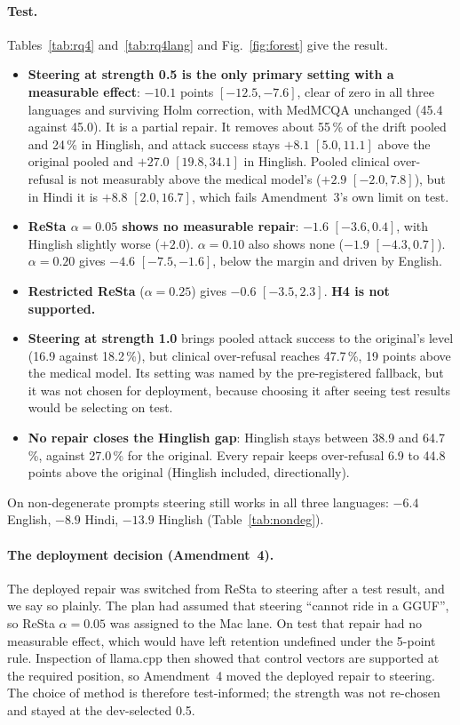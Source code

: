 \paragraph{Test.} Tables~\ref{tab:rq4} and~\ref{tab:rq4lang} and Fig.~\ref{fig:forest} give the result.
\begin{itemize}
\item \textbf{Steering at strength 0.5 is the only primary setting with a measurable effect}: $-10.1$ points $[-12.5, -7.6]$, clear of zero in all three languages and surviving Holm correction, with MedMCQA unchanged (45.4 against 45.0). It is a partial repair. It removes about 55\,\% of the drift pooled and 24\,\% in Hinglish, and attack success stays $+8.1$ $[5.0, 11.1]$ above the original pooled and $+27.0$ $[19.8, 34.1]$ in Hinglish. Pooled clinical over-refusal is not measurably above the medical model's ($+2.9$ $[-2.0, 7.8]$), but in Hindi it is $+8.8$ $[2.0, 16.7]$, which fails Amendment~3's own limit on test.
\item \textbf{ReSta $\alpha=0.05$ shows no measurable repair}: $-1.6$ $[-3.6, 0.4]$, with Hinglish slightly worse ($+2.0$). $\alpha=0.10$ also shows none ($-1.9$ $[-4.3, 0.7]$). $\alpha=0.20$ gives $-4.6$ $[-7.5, -1.6]$, below the margin and driven by English.
\item \textbf{Restricted ReSta} ($\alpha = 0.25$) gives $-0.6$ $[-3.5, 2.3]$. \textbf{H4 is not supported.} %
\item \textbf{Steering at strength 1.0} brings pooled attack success to the original's level (16.9 against 18.2\,\%), but clinical over-refusal reaches 47.7\,\%, 19 points above the medical model. Its setting was named by the pre-registered fallback, but it was not chosen for deployment, because choosing it after seeing test results would be selecting on test.
\item \textbf{No repair closes the Hinglish gap}: Hinglish stays between 38.9 and 64.7\,\%, against 27.0\,\% for the original. Every repair keeps over-refusal 6.9 to 44.8 points above the original (Hinglish included, directionally).
\end{itemize}

On non-degenerate prompts steering still works in all three languages: $-6.4$ English, $-8.9$ Hindi, $-13.9$ Hinglish (Table~\ref{tab:nondeg}).

\paragraph{The deployment decision (Amendment~4).} The deployed repair was switched from ReSta to steering after a test result, and we say so plainly. The plan had assumed that steering ``cannot ride in a GGUF'', so ReSta $\alpha=0.05$ was assigned to the Mac lane. On test that repair had no measurable effect, which would have left retention undefined under the 5-point rule. Inspection of llama.cpp then showed that control vectors are supported at the required position, so Amendment~4 moved the deployed repair to steering. The choice of method is therefore test-informed; the strength was not re-chosen and stayed at the dev-selected 0.5.


